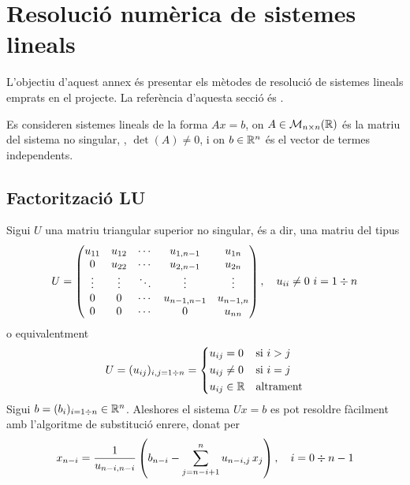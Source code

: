 
\section{Resolució numèrica de sistemes lineals} \label{ap:sistemes_lineals}

L'objectiu d'aquest annex és presentar els mètodes de resolució de sistemes lineals emprats en el projecte. La referència d'aquesta secció és \cite{apunts_aln}.

Es consideren sistemes lineals de la forma $A x = b$, on $A \in \mathcal{M}_{n \times n}(\mathbb{R})$ és la matriu del sistema no singular, \ie, $\det(A) \neq 0$, i on $b \in \mathbb{R}^n$ és el vector de termes independents.

\subsection{Factorització LU}

Sigui $U$ una matriu triangular superior no singular, és a dir, una matriu del tipus
\[
	U = 
	\begin{pmatrix}
		u_{11} 	& u_{12} & \cdots & u_{1,n-1} & u_{1n} \\
		0		& u_{22} & \cdots & u_{2,n-1} & u_{2n} \\
		\vdots	& \vdots & \ddots & \vdots 	  & \vdots \\
		0 		& 0		 & \cdots & u_{n-1,n-1} & u_{n-1,n} \\
		0 	   	& 0		 & \cdots & 0 			& u_{nn}
	\end{pmatrix},
	\quad
	u_{ii} \neq 0 \ i = 1 \divisionsymbol n
\]
o equivalentment
\[
	U = (u_{ij})_{i, j= 1 \divisionsymbol n} = 
	\left\{
	\begin{aligned}
		&u_{ij} = 0 		& 	&\text{si } i > j \\
		&u_{ij} \neq 0 		& 	&\text{si } i = j \\
		&u_{ij} \in \real 	& 	&\text{altrament} 
	\end{aligned}
	\right.
\]
Sigui $b = (b_i)_{i = 1 \divisionsymbol n} \in \real^n$. Aleshores el sistema $U x = b$ es pot resoldre fàcilment amb l'algoritme de substitució enrere, donat per
\[
	x_{n-i} =
	\frac{1}{u_{n-i,n-i}}
	\left(
	b_{n-i} - \sum_{j=n-i+1}^{n} u_{n-i,j} \, x_j
	\right),
	\quad i = 0 \divisionsymbol n-1
\]

